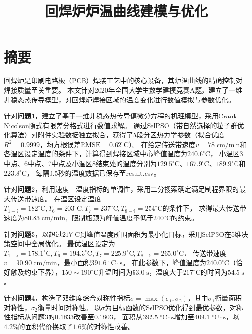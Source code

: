 \documentclass[12pt,a4paper]{ctexart}
\title{\vspace{-2cm}\textbf{回焊炉炉温曲线建模与优化}}
\author{}
\date{}
\begin{document}
\maketitle
\thispagestyle{empty}

\section*{摘\quad 要}
\thispagestyle{fancy}

回焊炉是印刷电路板（PCB）焊接工艺中的核心设备，其炉温曲线的精确控制对焊接质量至关重要。
本文针对2020年全国大学生数学建模竞赛A题，建立了一维非稳态热传导模型，对回焊炉焊接区域的温度变化进行数值模拟与参数优化。

针对\textbf{问题1}，建立了基于一维非稳态热传导偏微分方程的机理模型，采用Crank--Nicolson隐式有限差分格式进行数值求解。
通过SelPSO（带自然选择的粒子群优化算法）对附件实验数据独立拟合，获得了5段分区热力学参数（拟合优度$R^2=0.9999$，均方根误差$\mathrm{RMSE}=0.62^{\circ}\mathrm{C}$）。
在给定传送带速度$v=78\;\mathrm{cm/min}$和各温区设定温度的条件下，计算得到焊接区域中心峰值温度为$240.6^{\circ}\mathrm{C}$，
小温区3中点、6中点、7中点及小温区8结束处的温度分别为$129.5^{\circ}\mathrm{C}$、$167.9^{\circ}\mathrm{C}$、$189.9^{\circ}\mathrm{C}$和$223.8^{\circ}\mathrm{C}$，
每隔0.5秒的温度数据已保存至result.csv。

针对\textbf{问题2}，利用速度—温度指标的单调性，采用二分搜索确定满足制程界限的最大传送带速度。
在温区设定温度$T_{1-5}=182^{\circ}\mathrm{C},T_6=203^{\circ}\mathrm{C},T_7=237^{\circ}\mathrm{C},T_{8-9}=254^{\circ}\mathrm{C}$的条件下，
求得最大传送带速度为$\boldsymbol{80.83\;\mathrm{cm/min}}$，限制瓶颈为峰值温度不低于$240^{\circ}\mathrm{C}$的约束。

针对\textbf{问题3}，以超过$217^{\circ}\mathrm{C}$到峰值温度所围面积为最小化目标，采用SelPSO在5维决策空间中全局优化。
最优温区设定为$T_{1-5}=178.1^{\circ}\mathrm{C},T_6=194.3^{\circ}\mathrm{C},T_7=225.9^{\circ}\mathrm{C},T_{8-9}=265.0^{\circ}\mathrm{C}$，
传送带速度$v=90.90\;\mathrm{cm/min}$，最小面积$\boldsymbol{391.6\;^{\circ}\mathrm{C}\!\cdot\!\mathrm{s}}$。
在此参数下，峰值温度为$240.0^{\circ}\mathrm{C}$（恰好触及约束下界），$150\sim190^{\circ}\mathrm{C}$升温时间为$63.0\;\mathrm{s}$，温度大于$217^{\circ}\mathrm{C}$的时间为$54.5\;\mathrm{s}$。

针对\textbf{问题4}，构造了双维度综合对称性指标$\sigma=\max(\sigma_1,\sigma_2)$，其中$\sigma_1$衡量面积对称性，$\sigma_2$衡量时间对称性。
以$\sigma$为目标函数的SelPSO优化得到最优参数，对称性指标从问题3的$0.1833$改善至$\boldsymbol{0.1803}$，
面积从$392.5\;^{\circ}\mathrm{C}\!\cdot\!\mathrm{s}$增加至$409.1\;^{\circ}\mathrm{C}\!\cdot\!\mathrm{s}$，以$4.2\%$的面积代价换取了$1.6\%$的对称性改善。
\end{document}

